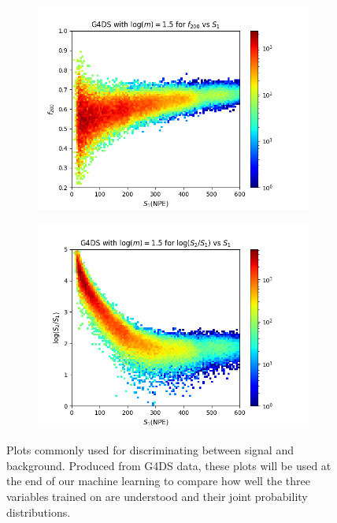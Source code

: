 \documentclass[11pt]{article} %
\begin{document}
\begin{figure}[H]
\begin{minipage}{.5\textwidth}
  \begin{subfigure}{.9\textwidth}
      \includegraphics[scale=0.6]{./images/g4_f200_vs_s1.png}
  \end{subfigure}
\end{minipage}
\begin{minipage}{.5\textwidth}
  \centering
  \begin{subfigure}{.9\textwidth}
      \includegraphics[scale=0.6]{./images/g4_s1_over_s2_vs_s1.png}
  \end{subfigure}
\end{minipage}
\caption{Plots commonly used for discriminating between signal and background.
Produced from G4DS data, these plots will be used at the end of our machine learning to compare how well the three variables trained on are understood and their joint probability distributions.}
\label{fig:g4ds_results}
\end{figure}
\end{document}
